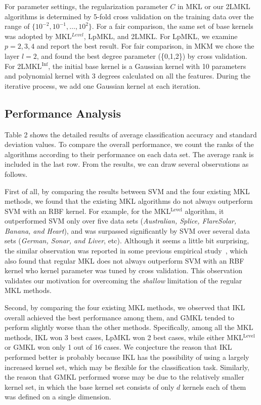 For parameter settings, the regularization parameter $C$ in MKL or our 2LMKL algorithms is determined by 5-fold cross validation on the training data over the range of $\{10^{-2}, 10^{-1}, \ldots, 10^2\}$. For a fair comparison, the same set of base kernels was adopted by MKL$^{Level}$, LpMKL, and 2LMKL. For LpMKL, we examine $p=2,3,4$ and report the best result. For fair comparison, in MKM we chose the layer $l = 2$, and found the best degree parameter (\{0,1,2\}) by cross validation. For 2LMKL$^{\mathrm{Inf}}$, the initial base kernel is a Gaussian kernel with 10 parameters and polynomial kernel with 3 degrees calculated on all the features. During the iterative process, we add one Gaussian kernel at each iteration.


\subsection{Performance Analysis}
Table 2 shows the detailed results of average classification accuracy and standard deviation values. To compare the overall performance,
we count the ranks of the algorithms according to their performance on each data set. The average rank is included in the last row. From the results, we can draw several observations as follows.

First of all, by comparing the results between SVM and the four existing MKL
methods, we found that the existing MKL algorithms do not always outperform SVM with an RBF kernel. For example, for the MKL$^{\mathrm{Level}}$ algorithm, it outperformed SVM only over five data sets ({\it Australian, Splice, FlareSolar, Banana, and Heart}), and was surpassed significantly by SVM over several data sets ({\it German, Sonar, and Liver}, etc). Although it seems a little bit surprising, the similar observation was reported in some previous empirical study~\cite{tr/GehlerN08}, which also found that regular MKL does not always outperform SVM with an RBF kernel who kernel parameter was tuned by cross validation. This observation validates our motivation for overcoming the {\it shallow} limitation of the regular MKL methods.

Second, by comparing the four existing MKL methods, we observed that IKL overall achieved the best performance among them, and GMKL tended to perform slightly worse than the other methods. Specifically, among all the MKL methods, IKL won 3 best cases, LpMKL won 2 best cases, while either MKL$^{\mathrm{Level}}$ or GMKL won only 1 out of 16 cases. We conjecture the reason that IKL performed better is probably because IKL has the possibility of using a largely increased kernel set, which may be flexible for the classification task. Similarly, the reason that GMKL performed worse may be due to the relatively smaller kernel set, in which the base kernel set consists of only $d$ kernels each of them was defined on a single dimension.

